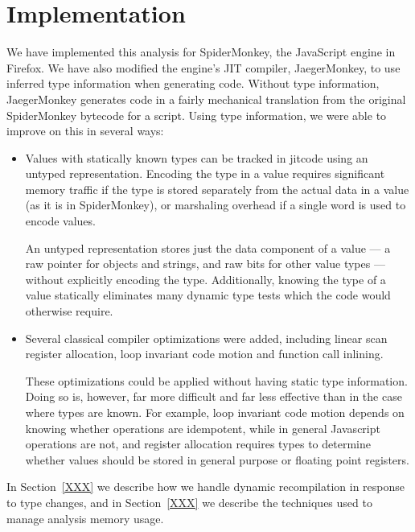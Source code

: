 
\section{Implementation}

We have implemented this analysis for SpiderMonkey, the JavaScript engine
in Firefox.
We have also modified the engine's JIT compiler, JaegerMonkey, to use
inferred type information when generating code.
Without type information, JaegerMonkey generates code in a fairly mechanical
translation from the original SpiderMonkey bytecode for a script.
Using type information, we were able to improve on this in several ways:

\begin{itemize}

\item Values with statically known types can be tracked in jitcode
using an untyped representation.
Encoding the type in a value requires significant memory traffic
if the type is stored separately from the actual data in a value
(as it is in SpiderMonkey),
or marshaling overhead if a single word is used to encode values.

An untyped representation stores just the data component of a value ---
a raw pointer for objects and strings, and raw bits for other value types ---
without explicitly encoding the type.
Additionally, knowing the type of a value statically eliminates many
dynamic type tests which the code would otherwise require.

\item Several classical compiler optimizations were added,
including linear scan register allocation, loop invariant code motion
and function call inlining.

These optimizations could be applied without
having static type information.
Doing so is, however, far more difficult and far less effective than in
the case where types are known.
For example, loop invariant code motion depends on knowing whether operations
are idempotent, while in general Javascript operations are not,
and register allocation requires types to determine whether values should
be stored in general purpose or floating point registers.

\end{itemize}

In Section~\ref{XXX} we describe how we handle dynamic recompilation in
response to type changes, and in Section~\ref{XXX} we describe the techniques
used to manage analysis memory usage.

